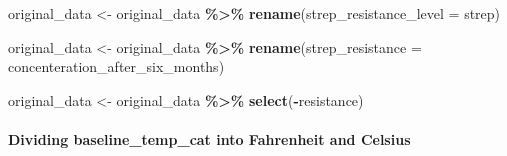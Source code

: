 \documentclass[
]{article}
\newenvironment{Shaded}{\begin{snugshade}}{\end{snugshade}}
\newcommand{\AttributeTok}[1]{\textcolor[rgb]{0.13,0.29,0.53}{#1}}
\newcommand{\FunctionTok}[1]{\textcolor[rgb]{0.13,0.29,0.53}{\textbf{#1}}}
\newcommand{\NormalTok}[1]{#1}
\newcommand{\OtherTok}[1]{\textcolor[rgb]{0.56,0.35,0.01}{#1}}
\newcommand{\SpecialCharTok}[1]{\textcolor[rgb]{0.81,0.36,0.00}{\textbf{#1}}}
\begin{document}
\begin{Shaded}
\begin{Highlighting}[]
\NormalTok{original\_data }\OtherTok{\textless{}{-}}\NormalTok{ original\_data }\SpecialCharTok{\%\textgreater{}\%}
  \FunctionTok{rename}\NormalTok{(}\AttributeTok{strep\_resistance\_level =}\NormalTok{ strep)}

\NormalTok{original\_data }\OtherTok{\textless{}{-}}\NormalTok{ original\_data }\SpecialCharTok{\%\textgreater{}\%}
  \FunctionTok{rename}\NormalTok{(}\AttributeTok{strep\_resistance =}\NormalTok{ concenteration\_after\_six\_months)}

\NormalTok{original\_data }\OtherTok{\textless{}{-}}\NormalTok{ original\_data }\SpecialCharTok{\%\textgreater{}\%} \FunctionTok{select}\NormalTok{(}\SpecialCharTok{{-}}\NormalTok{resistance)}
\end{Highlighting}
\end{Shaded}

\paragraph{Dividing baseline\_temp\_cat into Fahrenheit and
Celsius}\label{dividing-baseline_temp_cat-into-fahrenheit-and-celsius}
\end{document}
